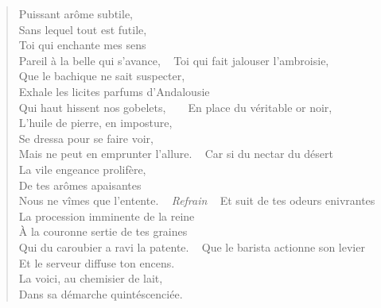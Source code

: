 \begin{verse}
Puissant arôme subtile,\\
Sans lequel tout est futile,\\
Toi qui enchante mes sens\\
Pareil à la belle qui s’avance,
~
Toi qui fait jalouser l’ambroisie,\\
Que le bachique ne sait suspecter,\\
Exhale les licites parfums d’Andalousie\\
Qui haut hissent nos gobelets,
~
~
En place du véritable or noir,\\
L’huile de pierre\label{foot.huiledepierre}, en imposture,\\
Se dressa pour se faire voir,\\
Mais ne peut en emprunter l’allure.
~
Car si du nectar du désert\\
La vile engeance prolifère,\\
De tes arômes apaisantes\\
Nous ne vîmes que l’entente.
~
\emph{Refrain}
~
Et suit de tes odeurs enivrantes\\
La procession imminente de la reine\\
À la couronne sertie de tes graines\\
Qui du caroubier a ravi la patente.
~
Que le barista actionne son levier\\
Et le serveur diffuse ton encens.\\
La voici, au chemisier de lait,\\
Dans sa démarche quintéscenciée.

\end{verse}
